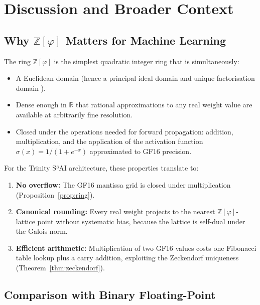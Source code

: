 \section{Discussion and Broader Context}\label{sec:ch7-discussion}

\subsection{Why \(\mathbb{Z}[\varphi]\) Matters for Machine Learning}
\label{subsec:ch7-ml}

The ring \(\mathbb{Z}[\varphi]\) is the simplest quadratic integer ring
that is simultaneously:
\begin{itemize}
  \item A Euclidean domain (hence a principal ideal domain and unique
        factorisation domain \cite{hardy_wright}).
  \item Dense enough in \(\mathbb{R}\) that rational approximations to
        any real weight value are available at arbitrarily fine resolution.
  \item Closed under the operations needed for forward propagation:
        addition, multiplication, and the application of the activation
        function \(\sigma(x) = 1/(1+e^{-x})\) approximated to GF16
        precision.
\end{itemize}

For the Trinity S³AI architecture, these properties translate to:
\begin{enumerate}
  \item \textbf{No overflow:} The GF16 mantissa grid is closed under
        multiplication (Proposition~\ref{prop:ring}).
  \item \textbf{Canonical rounding:} Every real weight projects to the
        nearest \(\mathbb{Z}[\varphi]\)-lattice point without systematic
        bias, because the lattice is self-dual under the Galois norm.
  \item \textbf{Efficient arithmetic:} Multiplication of two GF16 values
        costs one Fibonacci table lookup plus a carry addition, exploiting
        the Zeckendorf uniqueness (Theorem~\ref{thm:zeckendorf}).
\end{enumerate}

\subsection{Comparison with Binary Floating-Point}\label{subsec:ch7-binary}

